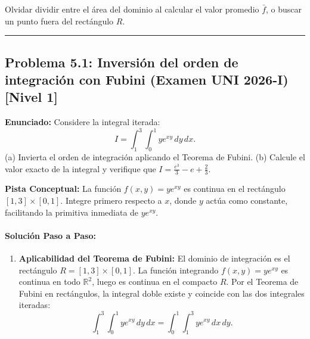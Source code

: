 \documentclass[11pt,a4paper]{article}
\begin{document}
\begin{trapbox}
Olvidar dividir entre el área del dominio al calcular el valor promedio $\bar{f}$, o buscar un punto fuera del rectángulo $R$.
\end{trapbox}

\vspace{0.5cm}
\hrule
\vspace{0.5cm}


\subsection*{Problema 5.1: Inversión del orden de integración con Fubini (Examen UNI 2026-I) \hfill \color{primaryblue}\small[Nivel 1]}

\begin{tcolorbox}[colback=white,colframe=gray!40,arc=1mm,boxrule=0.5pt,left=3mm,right=3mm,top=2mm,bottom=2mm]
\textbf{Enunciado:} Considere la integral iterada:
\begin{equation*}
I = \int_1^3 \int_0^1 y e^{xy} \, dy \, dx.
\end{equation*}
(a) Invierta el orden de integración aplicando el Teorema de Fubini. (b) Calcule el valor exacto de la integral y verifique que $I = \frac{e^3}{3} - e + \frac{2}{3}$.
\end{tcolorbox}

\begin{tcolorbox}[colback=yellow!4,colframe=accentamber!70,arc=1mm,boxrule=0.5pt,left=3mm,right=3mm,top=1.5mm,bottom=1.5mm]
\textbf{Pista Conceptual:} La función $f(x,y) = y e^{xy}$ es continua en el rectángulo $[1,3] \times [0,1]$. Integre primero respecto a $x$, donde $y$ actúa como constante, facilitando la primitiva inmediata de $y e^{xy}$.
\end{tcolorbox}

\paragraph{Solución Paso a Paso:}\par
\begin{enumerate}[label=\textbf{\arabic*.}]
\item \textbf{Aplicabilidad del Teorema de Fubini:}
El dominio de integración es el rectángulo $R = [1, 3] \times [0, 1]$.
La función integrando $f(x,y) = y e^{xy}$ es continua en todo $\mathbb{R}^2$, luego es continua en el compacto $R$.
Por el Teorema de Fubini en rectángulos, la integral doble existe y coincide con las dos integrales iteradas:
\begin{equation*}
\int_1^3 \int_0^1 y e^{xy} \, dy \, dx = \int_0^1 \int_1^3 y e^{xy} \, dx \, dy.
\end{equation*}
\end{enumerate}
\end{document}

